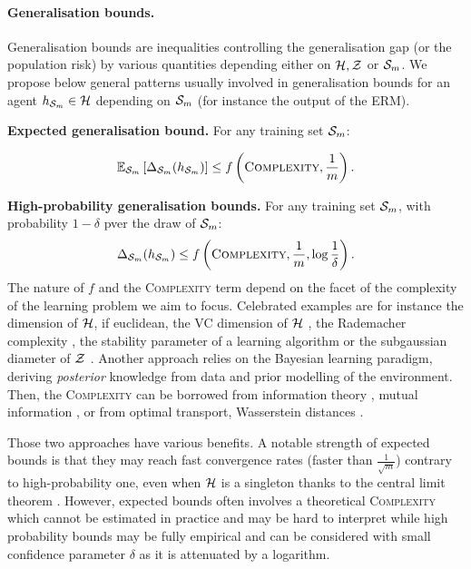 \paragraph{Generalisation bounds.} Generalisation bounds are inequalities controlling the generalisation gap (or the population risk) by various quantities depending either on $\H,\Z$ or $\S_m$. We propose below general patterns usually involved in generalisation bounds for an agent $h_{\Sm}\in\H$ depending on $\S_m$ (for instance the output of the ERM). 

\textbf{Expected generalisation bound.} For any training set $\S_m$:

\begin{align} 
  \label{eq: expected-bound}
  \mathbb{E}_{\S_m}\LB \Delta_{\Sm}(h_{\Sm}) \RB \leq f\LP \textsc{Complexity}, \frac{1}{m}\RP. 
\end{align}

\textbf{High-probability generalisation bounds.} For any training set $\S_m$, with probability $1-\delta$ pver the draw of $\Sm$:
\begin{align}
  \label{eq: hp-bound}
  \Delta_{\Sm}(h_{\Sm}) \leq f\LP \textsc{Complexity}, \frac{1}{m}, \log\frac{1}{\delta}\RP.
\end{align}
The nature of $f$ and the \textsc{Complexity} term depend on the facet of the complexity of the learning problem we aim to focus. Celebrated examples are for instance the dimension of $\H$, if euclidean, the VC dimension of $\H$ \citep{vapnik2000learning}, the Rademacher complexity \citep{bartlett2001rademacher,bartlett2002rademacher},  the stability parameter of a learning algorithm \citep{bousquet2000algo} or the subgaussian diameter of $\Z$ \citep{kontorovich2014conc}. 
Another approach relies on the Bayesian learning paradigm, deriving \emph{posterior} knowledge from data and prior modelling of the environment. 
Then, the \textsc{Complexity} can be borrowed from information theory \citep{cover2001elements}, \eg mutual information \citep{neal2012bayesian}, or from optimal transport, \eg Wasserstein distances \citep{wang2019information,rodriguez2021tighter}. 

Those two approaches have various benefits. A notable strength of expected bounds is that they may reach fast convergence rates (\ie faster than $\frac{1}{\sqrt{m}}$) contrary to high-probability one, even when $\H$ is a singleton thanks to the central limit theorem \citep{grunwald2021mac}. However, expected bounds often involves a theoretical \textsc{Complexity} which cannot be estimated in practice and may be hard to interpret while high probability bounds may be fully empirical and can be considered with small confidence parameter $\delta$ as it is attenuated by a logarithm.


